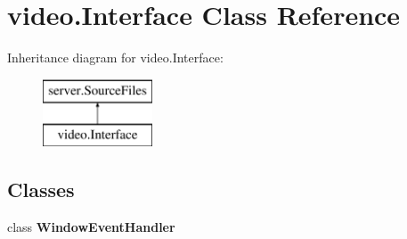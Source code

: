 \hypertarget{classvideo_1_1_interface}{
\section{video.Interface Class Reference}
\label{classvideo_1_1_interface}
}
Inheritance diagram for video.Interface:\begin{figure}[H]
\begin{center}
\leavevmode
\includegraphics[height=2.000000cm]{classvideo_1_1_interface}
\end{center}
\end{figure}
\subsection*{Classes}
\begin{DoxyCompactItemize}
\item 
class {\bfseries WindowEventHandler}
\end{DoxyCompactItemize}
